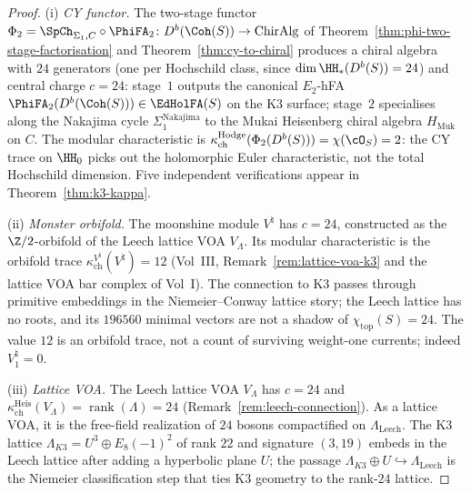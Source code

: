 \begin{proof}
(i) \emph{CY functor.} The two-stage functor
$\Phi_2 = \SpCh_{\Sigma_1, C} \circ \PhiFA_2 \colon D^b(\Coh(S)) \to \mathrm{ChirAlg}$
of Theorem~\ref{thm:phi-two-stage-factorisation} and Theorem~\ref{thm:cy-to-chiral}
produces a chiral algebra with $24$ generators (one per Hochschild class, since
$\dim \HH_*(D^b(S)) = 24$) and central charge $c = 24$: stage~$1$ outputs the
canonical $E_2$-hFA $\PhiFA_2(D^b(\Coh(S))) \in \EdHolFA(S)$ on the K3 surface;
stage~$2$ specialises along the Nakajima cycle $\Sigma_1^{\mathrm{Nakajima}}$ to
the Mukai Heisenberg chiral algebra $H_{\mathrm{Muk}}$ on $C$.
The modular characteristic is $\kappa_{\mathrm{ch}}^{\mathrm{Hodge}}(\Phi_2(D^b(S))) = \chi(\cO_S) = 2$:
the CY trace on $\HH_0$ picks out the holomorphic Euler characteristic, not the
total Hochschild dimension. Five independent verifications appear in
Theorem~\ref{thm:k3-kappa}.

(ii) \emph{Monster orbifold.} The moonshine module $V^\natural$ has $c = 24$,
constructed as the $\Z/2$-orbifold of the Leech lattice VOA $V_\Lambda$.
Its modular characteristic is the orbifold trace
\(\kappa_{\mathrm{ch}}^{V^\natural}(V^\natural) = 12\)
(Vol~III, Remark~\ref{rem:lattice-voa-k3} and the lattice VOA bar complex of
Vol~I). The connection to K3 passes through primitive embeddings in the
Niemeier--Conway lattice story; the Leech lattice has no roots, and its
$196560$ minimal vectors are not a shadow of \(\chi_{\mathrm{top}}(S)=24\).
The value \(12\) is an orbifold trace, not a count of surviving weight-one
currents; indeed \(V^\natural_1=0\).

(iii) \emph{Lattice VOA.} The Leech lattice VOA $V_\Lambda$ has $c = 24$ and
\(\kappa_{\mathrm{ch}}^{\mathrm{Heis}}(V_\Lambda) = \operatorname{rank}(\Lambda) = 24\)
(Remark~\ref{rem:leech-connection}). As a lattice VOA, it is the free-field
realization of $24$ bosons compactified on $\Lambda_{\mathrm{Leech}}$. The K3
lattice $\Lambda_{K3} = U^3 \oplus E_8(-1)^2$ of rank $22$ and signature $(3,19)$
embeds in the Leech lattice after adding a hyperbolic plane $U$; the passage
$\Lambda_{K3} \oplus U \hookrightarrow \Lambda_{\mathrm{Leech}}$ is the Niemeier
classification step that ties K3 geometry to the rank-$24$ lattice.
\end{proof}

